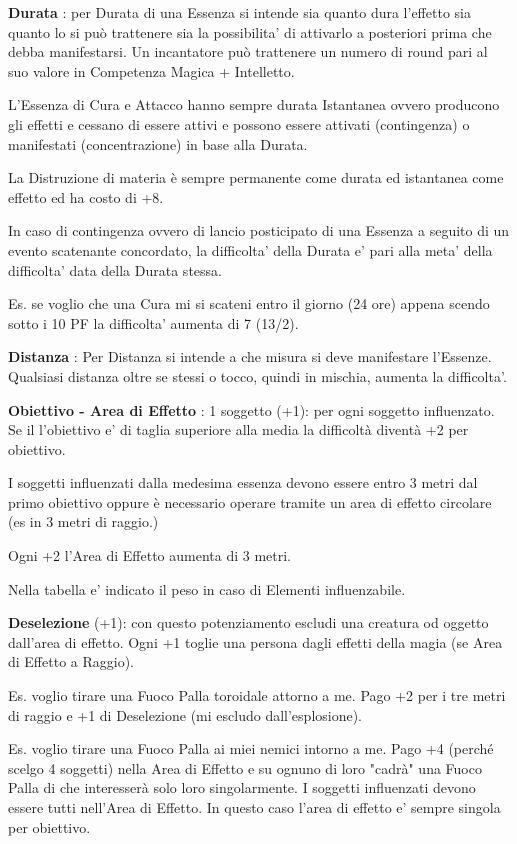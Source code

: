 \documentclass[a4paper,11pt,twoside,openany]{book}
\begin{document}
\bigskip

\textbf{Durata} : per Durata di una Essenza si intende sia quanto dura l'effetto sia quanto lo si può trattenere sia la possibilita' di attivarlo a posteriori prima che debba manifestarsi. Un incantatore può trattenere un numero di round pari al suo valore in Competenza Magica + Intelletto.

L'Essenza di Cura e Attacco hanno sempre durata Istantanea ovvero producono gli effetti e cessano di essere attivi e possono essere attivati (contingenza) o manifestati (concentrazione) in base alla Durata.

La Distruzione di materia è sempre permanente come durata ed istantanea come effetto ed ha costo di +8.

In caso di contingenza ovvero di lancio posticipato di una Essenza a seguito di un evento scatenante concordato, la difficolta' della Durata e' pari alla meta' della difficolta' data della Durata stessa.

Es. se voglio che una Cura mi si scateni entro il giorno (24 ore) appena scendo sotto i 10 PF la difficolta' aumenta di 7 (13/2).


\textbf{Distanza} : Per Distanza si intende a che misura si deve manifestare l'Essenze.
Qualsiasi distanza oltre se stessi o tocco, quindi in mischia, aumenta la difficolta'.


\textbf{Obiettivo - Area di Effetto} : 1 soggetto (+1): per ogni soggetto influenzato. Se il l'obiettivo e' di taglia superiore alla media la difficoltà diventà +2 per obiettivo.

I soggetti influenzati dalla medesima essenza devono essere entro 3 metri dal primo obiettivo oppure è necessario operare tramite un area di effetto circolare (es in 3 metri di raggio.)

Ogni +2 l'Area di Effetto aumenta di 3 metri.

Nella tabella e' indicato il peso in caso di Elementi influenzabile.


\textbf{Deselezione} (+1): con questo potenziamento escludi una creatura od oggetto dall'area di  effetto. Ogni +1 toglie una persona dagli effetti della magia (se Area di Effetto a Raggio).

Es. voglio tirare una Fuoco Palla toroidale attorno a me. Pago +2 per i tre metri di raggio e +1 di Deselezione (mi escludo dall'esplosione).

Es. voglio tirare una Fuoco Palla ai miei nemici intorno a me. Pago +4 (perché scelgo 4 soggetti) nella Area di Effetto e su ognuno di loro "cadrà" una Fuoco Palla di che interesserà solo loro singolarmente. I soggetti influenzati devono essere tutti nell'Area di Effetto. In questo caso l'area di effetto e' sempre singola per obiettivo.
\end{document}
